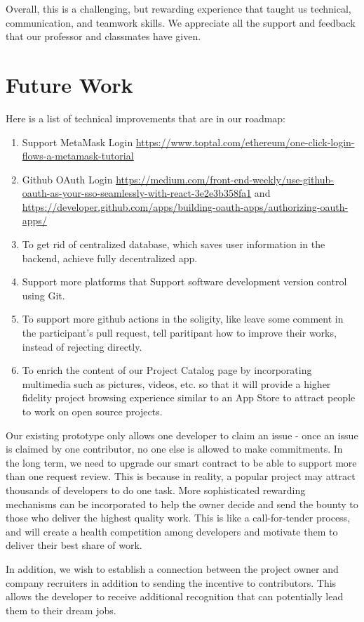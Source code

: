 \documentclass[12pt]{article}
\renewcommand{\_}{\kern-1.5pt\textunderscore\kern-1.5pt}
\begin{document}
Overall, this is a challenging, but rewarding experience that taught us technical, communication, and teamwork skills. We appreciate all the support and feedback that our professor and classmates have given.

\section{Future Work}
Here is a list of technical improvements that are in our roadmap:
\begin{enumerate}
    \item Support MetaMask Login \url{https://www.toptal.com/ethereum/one-click-login-flows-a-metamask-tutorial}
    \item  Github OAuth Login \url{https://medium.com/front-end-weekly/use-github-oauth-as-your-sso-seamlessly-with-react-3e2e3b358fa1} and \url{https://developer.github.com/apps/building-oauth-apps/authorizing-oauth-apps/}
\item To get rid of centralized database, which saves user information in the backend, achieve fully 
decentralized app.
\item Support more platforms that Support software development version control using Git.
\item To support more github actions in the soligity, like leave some comment in the participant's pull request, tell paritipant how to improve their works, instead of rejecting directly.
\item To enrich the content of our Project Catalog page by incorporating multimedia such as pictures, videos, etc. so that it will provide a higher fidelity project browsing experience similar to an App Store to attract people to work on open source projects.
\end{enumerate} 

Our existing prototype only allows one developer to claim an issue - once an issue is claimed by one contributor, no one else is allowed to make commitments. In the long term, we need to upgrade our smart contract to be able to support more than one request review. This is because in reality, a popular project may attract thousands of developers to do one task. More sophisticated rewarding mechanisms can be incorporated to help the owner decide and send the bounty to those who deliver the highest quality work. This is like a call-for-tender process, and will create a health competition among developers and motivate them to deliver their best share of work.

In addition, we wish to establish a connection between the project owner and company recruiters in addition to sending the incentive to contributors. This allows the developer to receive additional recognition that can potentially lead them to their dream jobs.  
\end{document}
